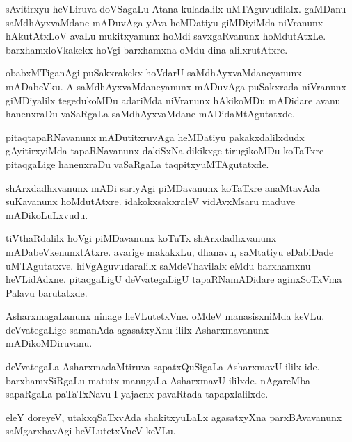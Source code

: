 \documentclass{article}
\begin{document}
\begin{mn}
sAvitirxyu  heVLiruva  doVSagaLu  Atana  kuladalilx  uMTAguvudilalx.  gaMDanu  
saMdhAyxvaMdane  mADuvAga  yAva  heMDatiyu  giMDiyiMda  niVranunx  hAkutAtxLoV  
avaLu  mukitxyanunx  hoMdi  savxgaRvanunx  hoMdutAtxLe.  barxhamxloVkakekx  
hoVgi  barxhamxna  oMdu  dina  alilxrutAtxre.
\end{mn}

\begin{mn}
obabxMTiganAgi  puSakxrakekx  hoVdarU  saMdhAyxvaMdaneyanunx  mADabeVku.   
A  saMdhAyxvaMdaneyanunx  mADuvAga  puSakxrada  
niVranunx  giMDiyalilx  tegedukoMDu  adariMda  niVranunx  hAkikoMDu  mADidare  
avanu  hanenxraDu  vaSaRgaLa  saMdhAyxvaMdane  mADidaMtAgutatxde. 
\end{mn}

\begin{mn}
pitaqtapaRNavanunx  mADutitxruvAga  heMDatiyu  pakakxdalilxdudx  gAyitirxyiMda  tapaRNavanunx  
dakiSxNa dikikxge  tirugikoMDu  koTaTxre  pitaqgaLige  hanenxraDu  vaSaRgaLa  taqpitxyuMTAgutatxde.
\end{mn}

\begin{mn}
shArxdadhxvanunx  mADi  sariyAgi  piMDavanunx  koTaTxre  anaMtavAda  suKavanunx  
hoMdutAtxre.  idakokxsakxraleV  vidAvxMsaru  maduve mADikoLuLxvudu.
\end{mn}

\begin{mn}
tiVthaRdalilx  hoVgi  piMDavanunx  koTuTx  shArxdadhxvanunx mADabeVkenunxtAtxre.  
avarige  makakxLu,  dhanavu,  saMtatiyu  eDabiDade  uMTAgutatxve.  hiVgAguvudaralilx  
saMdeVhavilalx  eMdu  barxhamxnu  heVLidAdxne.  pitaqgaLigU  deVvategaLigU  
tapaRNamADidare  aginxSoTxVma  Palavu  barutatxde.
\end{mn}

\begin{mn}
AsharxmagaLanunx  ninage  heVLutetxVne.  oMdeV  manasisxniMda  keVLu.  
deVvategaLige  samanAda  agasatxyXnu  ililx  Asharxmavanunx  mADikoMDiruvanu.  
\end{mn}

\begin{mn}
deVvategaLa  AsharxmadaMtiruva  sapatxQuSigaLa  AsharxmavU  ililx  ide.  
barxhamxSiRgaLu  matutx  manugaLa  AsharxmavU  ililxde.  nAgareMba  sapaRgaLa  
paTaTxNavu  I  yajacnx pavaRtada  tapapxlalilxde.
\end{mn}

\begin{mn}
eleY doreyeV,  utakxqSaTxvAda  shakitxyuLaLx  agasatxyXna  parxBAvavanunx  
saMgarxhavAgi  heVLutetxVneV  keVLu.  
\end{mn}
\end{document}
